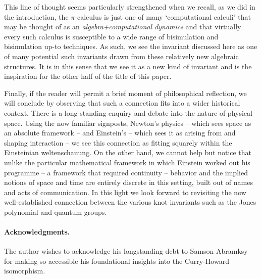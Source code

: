 \documentclass[]{llncs}
\begin{document}
This line of thought seems particularly strengthened when we recall,
as we did in the introduction, the $\pi$-calculus is just one of many
`computational calculi' that may be thought of as an
\emph{algebra+computational dynamics} and that virtually every such calculus
is susceptible to a wide range of bisimulation and bisimulation up-to
techniques. As such, we see the invariant discussed here as one of
many potential such invariants drawn from these relatively new
algebraic structures. It is in this sense that we see it as a new kind
of invariant and is the inspiration for the other half of the title of
this paper.

Finally, if the reader will permit a brief moment of philosophical
reflection, we will conclude by observing that such a connection fits
into a wider historical context. There is a long-standing enquiry and
debate into the nature of physical space. Using the now familiar
signposts, Newton's physics -- which sees space as an absolute
framework -- and Einstein's -- which sees it as arising from and
shaping interaction -- we see this connection as fitting squarely
within the Einsteinian weltenschauung. On the other hand, we cannot
help but notice that unlike the particular mathematical framework in
which Einstein worked out his programme -- a framework that required
continuity -- behavior and the implied notions of space and time are
entirely discrete in this setting, built out of names and acts of
communication. In this light we look forward to revisiting the now
well-established connection between the various knot invariants such
as the Jones polynomial and quantum groups.


\paragraph{Acknowledgments.}
The author wishes to acknowledge his longstanding debt to Samson
Abramksy for making so accessible his foundational insights into the
Curry-Howard isomorphism.





\end{document}
